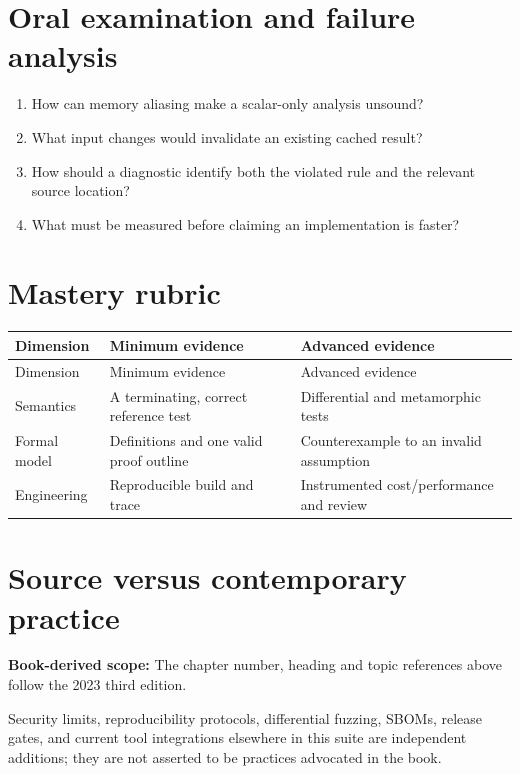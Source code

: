 \documentclass[10pt,letterpaper]{article}
\begin{document}
\section{Oral examination and failure analysis}
\begin{enumerate}
\item How can memory aliasing make a scalar-only analysis unsound?
\item What input changes would invalidate an existing cached result?
\item How should a diagnostic identify both the violated rule and the relevant source location?
\item What must be measured before claiming an implementation is faster?
\end{enumerate}

\section{Mastery rubric}
\begin{longtable}{|>{\raggedright\arraybackslash}p{}|>{\raggedright\arraybackslash}p{}|>{\raggedright\arraybackslash}p{}|}
\hline
Dimension & Minimum evidence & Advanced evidence\\ \hline\endfirsthead
\hline
Dimension & Minimum evidence & Advanced evidence\\ \hline\endhead
Semantics & A terminating, correct reference test & Differential and metamorphic tests\\ \hline
Formal model & Definitions and one valid proof outline & Counterexample to an invalid assumption\\ \hline
Engineering & Reproducible build and trace & Instrumented cost/performance and review\\ \hline
\end{longtable}

\section{Source versus contemporary practice}
\textbf{Book-derived scope:} The chapter number, heading and topic references above follow the 2023 third edition.\par\modern Security limits, reproducibility protocols, differential fuzzing, SBOMs, release gates, and current tool integrations elsewhere in this suite are independent additions; they are not asserted to be practices advocated in the book.
\end{document}
